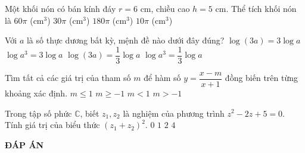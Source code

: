 	\begin{ex}%
		Một khối nón có bán kính đáy $r=6$ cm, chiều cao $h=5$ cm. Thể tích khối nón là
		\choice
		{\True $60\pi$ (cm$^3$)}
				{$30\pi$ (cm$^3$)}
						{$180\pi$ (cm$^3$)}
								{$10\pi$ (cm$^3$)}
		\end{ex}
	\begin{ex}%
		Với $a$ là số thực dương bất kỳ, mệnh đề nào dưới đây đúng?
		\choice
		{$\log(3a)=3\log a$}
				{\True $\log a^3=3\log a$}
						{$\log(3a)=\dfrac{1}{3}\log a$}
								{$\log a^3=\dfrac{1}{3}\log a$}
		\end{ex}
	\begin{ex}%
		Tìm tất cả các giá trị của tham số $m$ để hàm số $y=\dfrac{x-m}{x+1}$ đồng biến trên từng khoảng xác định.
		\choice
		{$m \le 1$}
		{$m \ge -1$}
		{$m<1$}
		{\True $m>-1$}
		\end{ex}
	\begin{ex}%
		Trong tập số phức $\mathbb{C}$, biết $z_1,z_2$ là nghiệm của phương trình $z^2-2z+5=0$. Tính giá trị của biểu thức $\left(z_1+z_2\right)^2$.
		\choice
		{$0$}
		{$1$}
		{$2$}
		{\True $4$}
		\end{ex}
\newpage
\begin{center}
	\textbf{ĐÁP ÁN}
\end{center}
\begin{multicols}{10}
	 
\end{multicols}


